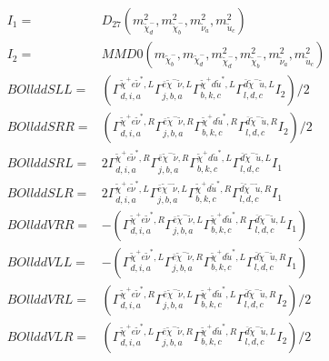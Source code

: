 \documentclass[A4,landscape]{article}
\begin{document}
\begin{align} 
I_1 = & D_{27}(m^2_{\tilde{\chi}^-_{{d}}}, m^2_{\tilde{\chi}^-_{{b}}}, m^2_{\tilde{\nu}_{{a}}}, m^2_{\tilde{u}_{{c}}}) \\ 
I_2 = & MMD0(m_{\tilde{\chi}^-_{{b}}}, m_{\tilde{\chi}^-_{{d}}}, m^2_{\tilde{\chi}^-_{{d}}}, m^2_{\tilde{\chi}^-_{{b}}}, m^2_{\tilde{\nu}_{{a}}}, m^2_{\tilde{u}_{{c}}}) \\ 
  BOllddSLL= & ( \Gamma^{\tilde{\chi}^+e \tilde{\nu}^*,L}_{d, i, a} \Gamma^{\bar{e}\tilde{\chi}^- \tilde{\nu} ,L}_{j, b, a} \Gamma^{\tilde{\chi}^+d \tilde{u}^*,L}_{b, k, c} \Gamma^{\bar{d}\tilde{\chi}^- \tilde{u} ,L}_{l, d, c} I_2)/2 \\ 
  BOllddSRR= & ( \Gamma^{\tilde{\chi}^+e \tilde{\nu}^*,R}_{d, i, a} \Gamma^{\bar{e}\tilde{\chi}^- \tilde{\nu} ,R}_{j, b, a} \Gamma^{\tilde{\chi}^+d \tilde{u}^*,R}_{b, k, c} \Gamma^{\bar{d}\tilde{\chi}^- \tilde{u} ,R}_{l, d, c} I_2)/2 \\ 
  BOllddSRL= & 2  \Gamma^{\tilde{\chi}^+e \tilde{\nu}^*,R}_{d, i, a} \Gamma^{\bar{e}\tilde{\chi}^- \tilde{\nu} ,R}_{j, b, a} \Gamma^{\tilde{\chi}^+d \tilde{u}^*,L}_{b, k, c} \Gamma^{\bar{d}\tilde{\chi}^- \tilde{u} ,L}_{l, d, c} I_1 \\ 
  BOllddSLR= & 2  \Gamma^{\tilde{\chi}^+e \tilde{\nu}^*,L}_{d, i, a} \Gamma^{\bar{e}\tilde{\chi}^- \tilde{\nu} ,L}_{j, b, a} \Gamma^{\tilde{\chi}^+d \tilde{u}^*,R}_{b, k, c} \Gamma^{\bar{d}\tilde{\chi}^- \tilde{u} ,R}_{l, d, c} I_1 \\ 
  BOllddVRR= & -( \Gamma^{\tilde{\chi}^+e \tilde{\nu}^*,R}_{d, i, a} \Gamma^{\bar{e}\tilde{\chi}^- \tilde{\nu} ,L}_{j, b, a} \Gamma^{\tilde{\chi}^+d \tilde{u}^*,R}_{b, k, c} \Gamma^{\bar{d}\tilde{\chi}^- \tilde{u} ,L}_{l, d, c} I_1) \\ 
  BOllddVLL= & -( \Gamma^{\tilde{\chi}^+e \tilde{\nu}^*,L}_{d, i, a} \Gamma^{\bar{e}\tilde{\chi}^- \tilde{\nu} ,R}_{j, b, a} \Gamma^{\tilde{\chi}^+d \tilde{u}^*,L}_{b, k, c} \Gamma^{\bar{d}\tilde{\chi}^- \tilde{u} ,R}_{l, d, c} I_1) \\ 
  BOllddVRL= & ( \Gamma^{\tilde{\chi}^+e \tilde{\nu}^*,R}_{d, i, a} \Gamma^{\bar{e}\tilde{\chi}^- \tilde{\nu} ,L}_{j, b, a} \Gamma^{\tilde{\chi}^+d \tilde{u}^*,L}_{b, k, c} \Gamma^{\bar{d}\tilde{\chi}^- \tilde{u} ,R}_{l, d, c} I_2)/2 \\ 
  BOllddVLR= & ( \Gamma^{\tilde{\chi}^+e \tilde{\nu}^*,L}_{d, i, a} \Gamma^{\bar{e}\tilde{\chi}^- \tilde{\nu} ,R}_{j, b, a} \Gamma^{\tilde{\chi}^+d \tilde{u}^*,R}_{b, k, c} \Gamma^{\bar{d}\tilde{\chi}^- \tilde{u} ,L}_{l, d, c} I_2)/2 \\ 

\end{align}
\end{document}
